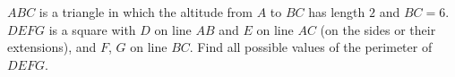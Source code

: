 $ABC$ is a triangle in which the altitude from $A$ to $BC$ has length $2$ and $BC=6$. $DEFG$ is a square with $D$ on line $AB$ and $E$ on line $AC$ (on the sides or their extensions), and $F$, $G$ on line $BC$. Find all possible values of the perimeter of $DEFG$.
